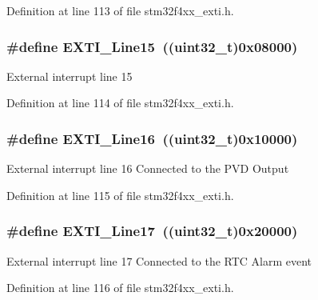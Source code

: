 Definition at line 113 of file stm32f4xx\-\_\-exti.\-h.

\hypertarget{group___e_x_t_i___lines_gafc5ea85d1fc095a855fde8977a338c4c}{
\subsubsection[{E\-X\-T\-I\-\_\-\-Line15}]{\setlength{\rightskip}{0pt plus 5cm}\#define E\-X\-T\-I\-\_\-\-Line15~((uint32\-\_\-t)0x08000)}}\label{group___e_x_t_i___lines_gafc5ea85d1fc095a855fde8977a338c4c}
External interrupt line 15 

Definition at line 114 of file stm32f4xx\-\_\-exti.\-h.

\hypertarget{group___e_x_t_i___lines_ga21326db7db8ca614c746b7f52dc45ead}{
\subsubsection[{E\-X\-T\-I\-\_\-\-Line16}]{\setlength{\rightskip}{0pt plus 5cm}\#define E\-X\-T\-I\-\_\-\-Line16~((uint32\-\_\-t)0x10000)}}\label{group___e_x_t_i___lines_ga21326db7db8ca614c746b7f52dc45ead}
External interrupt line 16 Connected to the P\-V\-D Output 

Definition at line 115 of file stm32f4xx\-\_\-exti.\-h.

\hypertarget{group___e_x_t_i___lines_ga3e0fc18bc0722adc09605e3093b24c6a}{
\subsubsection[{E\-X\-T\-I\-\_\-\-Line17}]{\setlength{\rightskip}{0pt plus 5cm}\#define E\-X\-T\-I\-\_\-\-Line17~((uint32\-\_\-t)0x20000)}}\label{group___e_x_t_i___lines_ga3e0fc18bc0722adc09605e3093b24c6a}
External interrupt line 17 Connected to the R\-T\-C Alarm event 

Definition at line 116 of file stm32f4xx\-\_\-exti.\-h.

